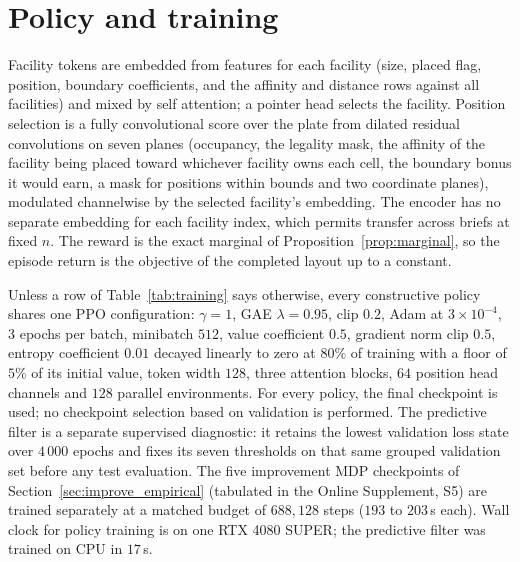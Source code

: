 \documentclass[preprint,12pt,authoryear]{elsarticle}
\begin{document}
\section{Policy and training}
\label{app:policy}
Facility tokens are embedded from features for each facility (size, placed flag,
position, boundary coefficients, and the affinity and distance rows against all
facilities) and mixed by self attention; a pointer head selects the facility.
Position selection is a fully convolutional score over the plate from dilated
residual convolutions on seven planes (occupancy, the legality mask, the affinity
of the facility being placed toward whichever facility owns each cell, the
boundary bonus it would earn, a mask for positions within bounds and two coordinate planes),
modulated channelwise by the selected facility's embedding. The encoder has no
separate embedding for each facility index, which permits transfer across briefs at
fixed $n$. The reward is the exact marginal of Proposition~\ref{prop:marginal},
so the episode return is the objective of the completed layout up to a
constant.

Unless a row of Table~\ref{tab:training} says otherwise, every constructive
policy shares one PPO configuration: $\gamma=1$, GAE $\lambda=0.95$, clip
$0.2$, Adam at $3\times10^{-4}$, $3$ epochs per batch, minibatch $512$,
value coefficient $0.5$, gradient norm clip $0.5$, entropy coefficient $0.01$
decayed linearly to zero at $80\%$ of training with a floor of $5\%$ of its
initial value, token width $128$, three attention blocks, $64$ position head
channels and $128$ parallel environments. For every policy, the final checkpoint
is used; no checkpoint selection based on validation is performed. The predictive
filter is a separate supervised diagnostic: it retains the lowest validation loss
state over $4\,000$ epochs and fixes its seven thresholds on that same grouped
validation set before any test evaluation. The five
improvement MDP checkpoints of Section~\ref{sec:improve_empirical} (tabulated
in the Online Supplement, S5) are trained separately
at a matched budget of $688{,}128$ steps ($193$ to $203$\,s each). Wall clock
for policy training is on one RTX 4080 SUPER; the predictive filter was trained
on CPU in $17$\,s.
\end{document}
